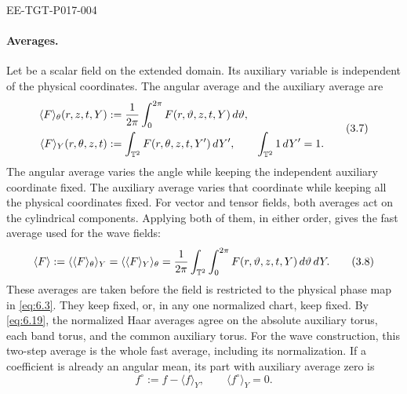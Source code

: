 \begin{EESegment}{EE-TGT-P017-004}
\paragraph{Averages.}
Let  be a scalar field on the extended domain. Its
auxiliary variable  is independent of the physical
coordinates. The angular average and the auxiliary average are
\begin{equation}
\begin{aligned}
\langle F\rangle_\theta(r,z,t,Y)
  &:=\frac1{2\pi}\int_0^{2\pi}F(r,\vartheta,z,t,Y)\,d\vartheta,\\
\langle F\rangle_Y(r,\theta,z,t)
  &:=\int_{\mathbb{T}^2}F(r,\theta,z,t,Y')\,dY',
  \qquad \int_{\mathbb{T}^2}1\,dY'=1.
\end{aligned}
\tag{3.7}\label{eq:3.7}
\end{equation}
The angular average varies the angle while keeping the independent auxiliary coordinate
fixed. The auxiliary average varies that coordinate while keeping all the physical
coordinates fixed. For vector and tensor fields, both averages act on the cylindrical
components. Applying both of them, in either order, gives the fast average used for the wave
fields:
\begin{equation}
\langle F\rangle
:=\langle\langle F\rangle_\theta\rangle_Y
=\langle\langle F\rangle_Y\rangle_\theta
=\frac1{2\pi}\int_{\mathbb{T}^2}\int_0^{2\pi}F(r,\vartheta,z,t,Y)\,d\vartheta\,dY.
\tag{3.8}\label{eq:3.8}
\end{equation}
These averages are taken before the field is restricted to the physical phase map in
\eqref{eq:6.3}. They keep  fixed, or, in any one normalized
chart, keep  fixed. By \eqref{eq:6.19}, the normalized Haar
averages agree on the absolute auxiliary torus, each band torus, and the common auxiliary
torus. For the wave construction, this two-step average is the whole fast average, including
its normalization. If a coefficient is already an angular mean, its part with auxiliary
average zero is
\begin{equation}
f^\circ:=f-\langle f\rangle_Y,
\qquad
\langle f^\circ\rangle_Y=0.
\tag{3.9}\label{eq:3.9}
\end{equation}
\end{EESegment}

